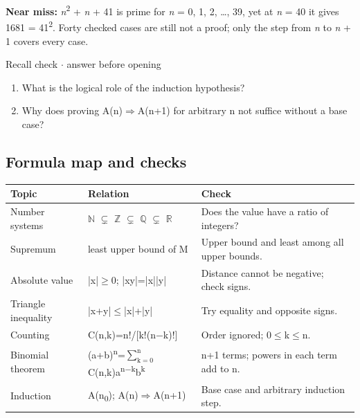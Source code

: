 \documentclass[11pt]{article}
\begin{document}
\begin{keepsection}
\begin{notebox}\textbf{Near miss:} \textit{n}\textsuperscript{2} + \textit{n} + 41 is prime for \textit{n} = 0, 1, 2, …, 39, yet at \textit{n} = 40 it gives 1681 = 41\textsuperscript{2}. Forty checked cases are still not a proof; only the step from \textit{n} to \textit{n} + 1 covers every case.\end{notebox}

\begin{recallbox}{Recall check \ensuremath{\cdot} answer before opening}
\begin{enumerate}
\item What is the logical role of the induction hypothesis?
\item Why does proving A(n)\ensuremath{\Rightarrow}A(n+1) for arbitrary n not suffice without a base case?
\end{enumerate}

\end{recallbox}
\end{keepsection}

\begin{keepsection}
\section{Formula map and checks}

\begin{center}\small\begin{tabularx}{\linewidth}{>{\raggedright\arraybackslash}X>{\raggedright\arraybackslash}X>{\raggedright\arraybackslash}X}\toprule
\textbf{Topic} & \textbf{Relation} & \textbf{Check} \\ \midrule
Number systems & \ensuremath{\mathbb{N}} \ensuremath{\subsetneq} \ensuremath{\mathbb{Z}} \ensuremath{\subsetneq} \ensuremath{\mathbb{Q}} \ensuremath{\subsetneq} \ensuremath{\mathbb{R}} & Does the value have a ratio of integers? \\
Supremum & least upper bound of M & Upper bound and least among all upper bounds. \\
Absolute value & |x|\ensuremath{\geq}0; |xy|=|x||y| & Distance cannot be negative; check signs. \\
Triangle inequality & |x+y|\ensuremath{\leq}|x|+|y| & Try equality and opposite signs. \\
Counting & C(n,k)=n!/[k!(n\ensuremath{-}k)!] & Order ignored; 0\ensuremath{\leq}k\ensuremath{\leq}n. \\
Binomial theorem & (a+b)\textsuperscript{n}=$\sum_{\mathrm{k}=0}^{\mathrm{n}} $ C(n,k)a\textsuperscript{n\ensuremath{-}k}b\textsuperscript{k} & n+1 terms; powers in each term add to n. \\
Induction & A(n\textsubscript{0}); A(n)\ensuremath{\Rightarrow}A(n+1) & Base case and arbitrary induction step. \\
\bottomrule\end{tabularx}\end{center}
\end{keepsection}
\end{document}
